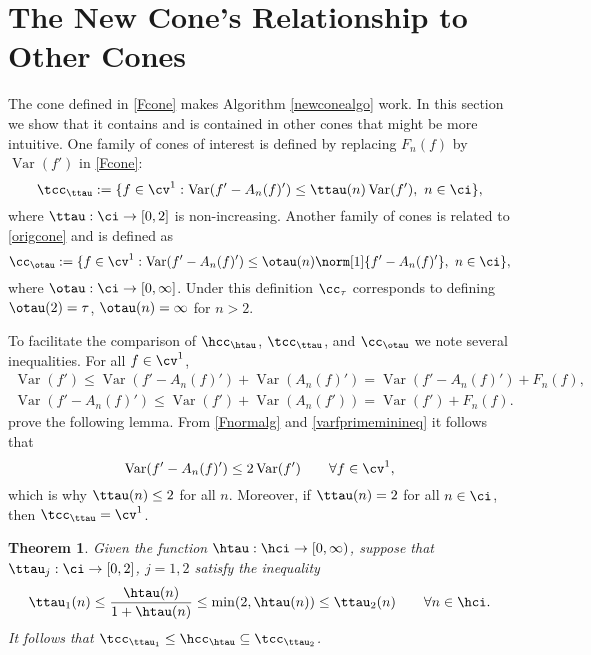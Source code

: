 \documentclass[]{elsarticle}
\DeclareMathOperator{\Var}{Var}
\newtheorem{theorem}{Theorem}
\theoremstyle{definition}
\theoremstyle{remark}
\begin{document}
\section{The New Cone's Relationship to Other Cones}

The cone defined in \eqref{Fcone} makes Algorithm \ref{newconealgo} work.  In this section we show that it contains and is contained in other cones that might be more intuitive.  One family of cones of interest is defined by replacing $F_n(f)$ by $\Var(f')$ in \eqref{Fcone}:
\begin{equation}\label{varcone}
\tcc_{\ttau}:=\{f\in \cv^{1}:\Var(f'-A_n(f)')\leq\ttau(n)\Var(f'), \ n \in  \ci\},
\end{equation}
where $\ttau:\ci \to [0,2]$ is non-increasing.  Another family of cones is related to \eqref{origcone} and is defined as
\begin{equation}\label{origconefamily}
\cc_{\otau}:=\{f\in \cv^{1}:\Var(f'-A_n(f)')\leq\otau(n)\norm[1]{f'-A_n(f)'}, \ n \in  \ci\},
\end{equation}
where $\otau:\ci \to [0,\infty]$.  Under this definition $\cc_{\tau}$ corresponds to defining $\otau(2)=\tau$, $\otau(n)=\infty$ for $n>2$.

To facilitate the comparison of  $\hcc_{\htau}$,  $\tcc_{\ttau}$, and $\cc_{\otau}$ we note several inequalities. For all $f \in \cv^1$,
\begin{gather}
\label{varfprimeineq}
\Var(f') \le \Var(f'-A_n(f)') + \Var(A_n(f)') = \Var(f'-A_n(f)') + F_n(f), \\
\label{varfprimeminineq}
\Var(f'-A_n(f)') \le \Var(f')+ \Var(A_n(f')) = \Var(f')+ F_n(f).
\end{gather} prove the following lemma.
From \eqref{Fnormalg} and \eqref{varfprimeminineq} it follows that 
\begin{equation} \label{twoineq}
\Var(f'-A_n(f)') \le 2\Var(f') \qquad \forall f \in \cv^1,
\end{equation}
which is why $\ttau(n) \le 2$ for all $n$. Moreover, if $\ttau(n) = 2$ for all $n \in \ci$, then $\tcc_{\ttau}=\cv^1$.

\begin{theorem} \label{twoinclusiontildethm} Given the function $\htau:\hci \to [0,\infty)$, suppose that $\ttau_j : \ci \to [0,2]$, $j=1,2$ satisfy the inequality
\begin{equation} \label{inequaltilde}
\ttau_1(n) \le \frac{\htau(n)}{1+\htau(n)} \le \min(2,\htau(n)) \le \ttau_2(n) \qquad \forall  n \in \hci.
\end{equation}
It follows that $\tcc_{\ttau_1} \le \hcc_{\htau} \subseteq \tcc_{\ttau_2}$.
\end{theorem}
\end{document}
